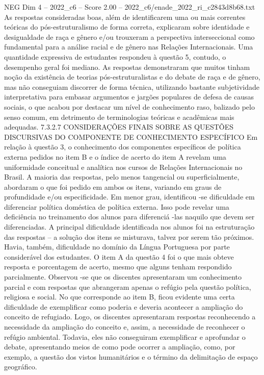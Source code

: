 \begin{textsample}{NEG Dim 4 – 2022\_c6 – Score 2.00 – 2022\_c6/enade\_2022\_ri\_c2843d8b68.txt}
As respostas consideradas boas, além de identificarem uma ou mais correntes teóricas do pós-estruturalismo de forma correta, explicaram sobre identidade e desigualdade de raça e gênero e/ou trouxeram a perspectiva interseccional como fundamental para a análise racial e de gênero nas Relações Internacionais.
Uma quantidade expressiva de estudantes respondeu à questão 5, contudo, o desempenho geral foi mediano.
As respostas demonstraram que muitos tinham noção da existência de teorias pós-estruturalistas e do debate de raça e de gênero, mas não conseguiam discorrer de forma técnica, utilizando bastante subjetividade interpretativa para embasar argumentos e jargões populares de defesa de causas sociais, o que acabou por destacar um nível de conhecimento raso, balizado pelo senso comum, em detrimento de terminologias teóricas e acadêmicas mais adequadas. 7.3.2.7 CONSIDERAÇÕES FINAIS SOBRE AS QUESTÕES DISCURSIVAS DO COMPONENTE DE CONHECIMENTO ESPECÍFICO Em relação à questão 3, o conhecimento dos componentes específicos de política externa pedidos no item B e o índice de acerto do item A revelam uma uniformidade conceitual e analítica nos cursos de Relações Internacionais no Brasil.
A maioria das respostas, pelo menos tangencial ou superficialmente, abordaram o que foi pedido em ambos os itens, variando em graus de profundidade e/ou especificidade.
Em menor grau, identificou -se dificuldade em diferenciar política doméstica de política externa.
Isso pode revelar uma deficiência no treinamento dos alunos para diferenciá -las naquilo que devem ser diferenciadas.
A principal dificuldade identificada nos alunos foi na estruturação das respostas – a solução dos itens se misturava, talvez por serem tão próximos.
Havia, também, dificuldade no domínio da Língua Portuguesa por parte considerável dos estudantes.
O item A da questão 4 foi o que mais obteve resposta e porcentagem de acerto, mesmo que alguns tenham respondido parcialmente.
Observou -se que os discentes apresentaram um conhecimento parcial e com respostas que abrangeram apenas o refúgio pela questão política, religiosa e social.
No que corresponde ao item B, ficou evidente uma certa dificuldade de exemplificar como poderia e deveria acontecer a ampliação do conceito de refugiado.
Logo, os discentes apresentaram respostas reconhecendo a necessidade da ampliação do conceito e, assim, a necessidade de reconhecer o refúgio ambiental.
Todavia, eles não conseguiram exemplificar e aprofundar o debate, apresentando meios de como pode ocorrer a ampliação, como, por exemplo, a questão dos vistos humanitários e o término da delimitação de espaço geográfico.

\end{textsample}
